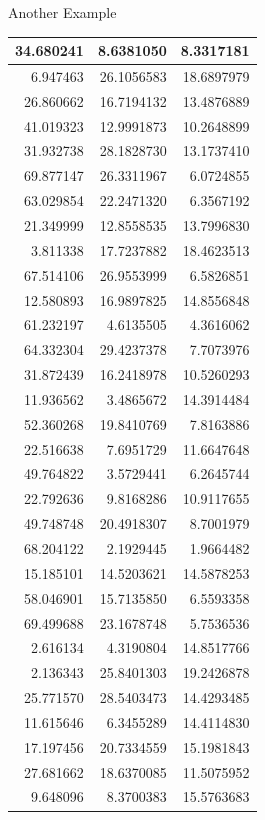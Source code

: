 \documentclass[
  ignorenonframetext,
]{beamer}
\begin{document}
\begin{frame}{Another Example}
\begin{table}
\begin{tabular}[t]{r|r|r}
\hline
34.680241 & 8.6381050 & 8.3317181\\
\hline
6.947463 & 26.1056583 & 18.6897979\\
\hline
26.860662 & 16.7194132 & 13.4876889\\
\hline
41.019323 & 12.9991873 & 10.2648899\\
\hline
31.932738 & 28.1828730 & 13.1737410\\
\hline
69.877147 & 26.3311967 & 6.0724855\\
\hline
63.029854 & 22.2471320 & 6.3567192\\
\hline
21.349999 & 12.8558535 & 13.7996830\\
\hline
3.811338 & 17.7237882 & 18.4623513\\
\hline
67.514106 & 26.9553999 & 6.5826851\\
\hline
12.580893 & 16.9897825 & 14.8556848\\
\hline
61.232197 & 4.6135505 & 4.3616062\\
\hline
64.332304 & 29.4237378 & 7.7073976\\
\hline
31.872439 & 16.2418978 & 10.5260293\\
\hline
11.936562 & 3.4865672 & 14.3914484\\
\hline
52.360268 & 19.8410769 & 7.8163886\\
\hline
22.516638 & 7.6951729 & 11.6647648\\
\hline
49.764822 & 3.5729441 & 6.2645744\\
\hline
22.792636 & 9.8168286 & 10.9117655\\
\hline
49.748748 & 20.4918307 & 8.7001979\\
\hline
68.204122 & 2.1929445 & 1.9664482\\
\hline
15.185101 & 14.5203621 & 14.5878253\\
\hline
58.046901 & 15.7135850 & 6.5593358\\
\hline
69.499688 & 23.1678748 & 5.7536536\\
\hline
2.616134 & 4.3190804 & 14.8517766\\
\hline
2.136343 & 25.8401303 & 19.2426878\\
\hline
25.771570 & 28.5403473 & 14.4293485\\
\hline
11.615646 & 6.3455289 & 14.4114830\\
\hline
17.197456 & 20.7334559 & 15.1981843\\
\hline
27.681662 & 18.6370085 & 11.5075952\\
\hline
9.648096 & 8.3700383 & 15.5763683\\

\end{tabular}
\end{table}
\end{frame}
\end{document}
